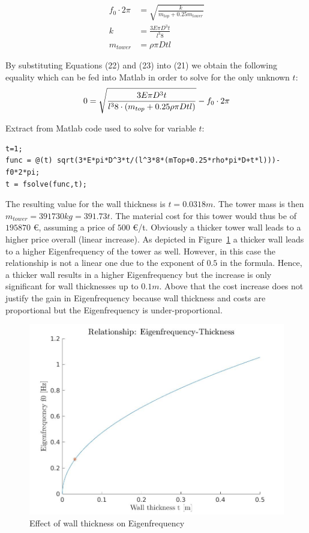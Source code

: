 \documentclass[10pt]{article}
\begin{document}
\begin{align}
f_0 \cdot 2 \pi &= \sqrt{\frac{k}{m_{top} + 0.25 m_{tower}}} \\
k &= \frac{3 E \pi D^3 t}{l^3 8} \\
m_{tower} &= \rho \pi D t l
\end{align}

By substituting Equations (22) and (23) into (21) we obtain the following equality which can be fed into Matlab in order to solve for the only unknown $t$:\\

\begin{equation*}
0 = \sqrt{\frac{3 E \pi D^3 t}{l^3 8 \cdot (m_{top} + 0.25\rho \pi D t l)}} -f_0 \cdot 2 \pi \\
\end{equation*}

Extract from Matlab code used to solve for variable $t$:\\

\begin{lstlisting}
t=1;
func = @(t) sqrt(3*E*pi*D^3*t/(l^3*8*(mTop+0.25*rho*pi*D+t*l)))-f0*2*pi;
t = fsolve(func,t);
\end{lstlisting}

The resulting value for the wall thickness is $t=0.0318m$. The tower mass is then $m_{tower}=391730 kg = 391.73t$. The material cost for this tower would thus be of $195870$ \euro, assuming a price of $500$ \euro /t. Obviously a thicker tower wall leads to a higher price overall (linear increase). As depicted in Figure~\ref{fig:eigfreqWall} a thicker wall leads to a higher Eigenfrequency of the tower as well. However, in this case the relationship is not a linear one due to the exponent of $0.5$ in the formula. Hence, a thicker wall results in a higher Eigenfrequency but the increase is only significant for wall thicknesses up to $0.1m$. Above that the cost increase does not justify the gain in Eigenfrequency because wall thickness and costs are proportional but the Eigenfrequency is under-proportional.

\begin{figure}[H]
\centering
\includegraphics[width=\linewidth]{../CIP_4/figures/eigenfrequency.jpg}
\caption{Effect of wall thickness on Eigenfrequency}
\label{fig:eigfreqWall}
\end{figure} 
\end{document}
